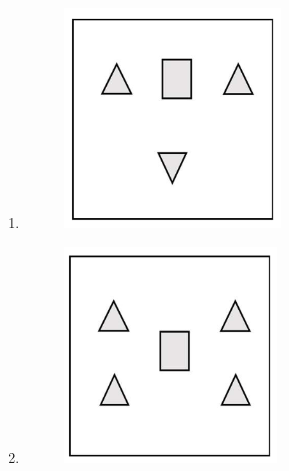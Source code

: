 \documentclass[a4paper, 11pt]{article}
\begin{document}
\begin{enumerate}
\begin{enumerate}
\begin{figure}[H]
        \label{fig:placeholder}
    \end{figure}
    \item \begin{figure}[H]
        \includegraphics[width=\columnwidth]{figs/fig_5.2.png}
        \label{fig:placeholder}
    \end{figure}
    \item \begin{figure}[H]
        \includegraphics[width=\columnwidth]{figs/fig_5.3.png}

\end{figure}
\end{enumerate}
\end{enumerate}
\end{document}
